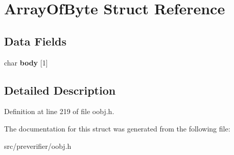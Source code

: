 \section{ArrayOfByte Struct Reference}
\label{struct_array_of_byte}
\subsection*{Data Fields}
\begin{DoxyCompactItemize}
\item 
char {\bfseries body} [1]\label{struct_array_of_byte_a97cbe34e6b70bb1cd014416b8a08328a}

\end{DoxyCompactItemize}


\subsection{Detailed Description}


Definition at line 219 of file oobj.h.



The documentation for this struct was generated from the following file:\begin{DoxyCompactItemize}
\item 
src/preverifier/oobj.h\end{DoxyCompactItemize}
